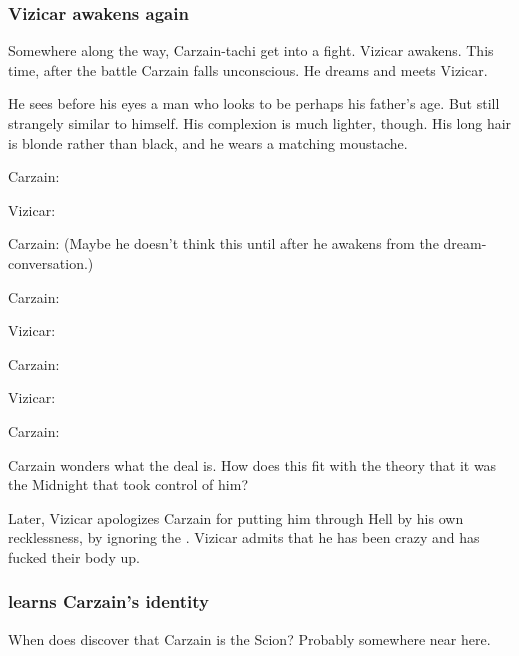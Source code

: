 \begin{garbage}
\subsubsection{Vizicar awakens again}
Somewhere along the way, Carzain-tachi get into a fight. Vizicar awakens. This time, after the battle Carzain falls unconscious. He dreams and meets Vizicar. 

He sees before his eyes a man who looks to be perhaps his father's age. 
But still strangely similar to himself. 
His complexion is much lighter, though. 
His long hair is blonde rather than black, and he wears a matching moustache. 

Carzain: 

Vizicar: 

Carzain: 
(Maybe he doesn't think this until after he awakens from the dream-conversation.)

Carzain: 

Vizicar: 

Carzain: 

Vizicar: 

Carzain: 

Carzain wonders what the deal is. 
How does this fit with the theory that it was the Midnight \Qliphoth{} that took control of him? 

Later, Vizicar apologizes Carzain for putting him through Hell by his own recklessness, by ignoring the . 
Vizicar admits that he has been crazy and has fucked their body up. 





\subsubsection{\Esmerel{} learns Carzain's identity}
When does \Esmerel{} discover that Carzain is the Scion? 
Probably somewhere near here. 


\end{garbage}
